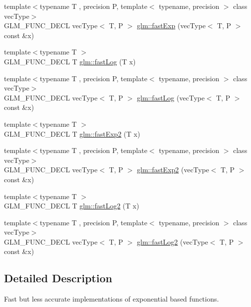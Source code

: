 \begin{DoxyCompactItemize}
{\footnotesize template$<$typename T , precision P, template$<$ typename, precision $>$ class vec\+Type$>$ }\\G\+L\+M\+\_\+\+F\+U\+N\+C\+\_\+\+D\+E\+C\+L vec\+Type$<$ T, P $>$ \hyperlink{group__gtx__fast__exponential_ga4faf0b61115de36efcf47c4ecb55a5fa}{glm\+::fast\+Exp} (vec\+Type$<$ T, P $>$ const \&x)
\item 
{\footnotesize template$<$typename T $>$ }\\G\+L\+M\+\_\+\+F\+U\+N\+C\+\_\+\+D\+E\+C\+L T \hyperlink{group__gtx__fast__exponential_gae1bdc97b7f96a600e29c753f1cd4388a}{glm\+::fast\+Log} (T x)
\item 
{\footnotesize template$<$typename T , precision P, template$<$ typename, precision $>$ class vec\+Type$>$ }\\G\+L\+M\+\_\+\+F\+U\+N\+C\+\_\+\+D\+E\+C\+L vec\+Type$<$ T, P $>$ \hyperlink{group__gtx__fast__exponential_ga789abcbc34d08008d2f5a4547dd6e5e3}{glm\+::fast\+Log} (vec\+Type$<$ T, P $>$ const \&x)
\item 
{\footnotesize template$<$typename T $>$ }\\G\+L\+M\+\_\+\+F\+U\+N\+C\+\_\+\+D\+E\+C\+L T \hyperlink{group__gtx__fast__exponential_ga0af50585955eb14c60bb286297fabab2}{glm\+::fast\+Exp2} (T x)
\item 
{\footnotesize template$<$typename T , precision P, template$<$ typename, precision $>$ class vec\+Type$>$ }\\G\+L\+M\+\_\+\+F\+U\+N\+C\+\_\+\+D\+E\+C\+L vec\+Type$<$ T, P $>$ \hyperlink{group__gtx__fast__exponential_ga9e6219327b7a33077dbec7620d981fff}{glm\+::fast\+Exp2} (vec\+Type$<$ T, P $>$ const \&x)
\item 
{\footnotesize template$<$typename T $>$ }\\G\+L\+M\+\_\+\+F\+U\+N\+C\+\_\+\+D\+E\+C\+L T \hyperlink{group__gtx__fast__exponential_ga6e98118685f6dc9e05fbb13dd5e5234e}{glm\+::fast\+Log2} (T x)
\item 
{\footnotesize template$<$typename T , precision P, template$<$ typename, precision $>$ class vec\+Type$>$ }\\G\+L\+M\+\_\+\+F\+U\+N\+C\+\_\+\+D\+E\+C\+L vec\+Type$<$ T, P $>$ \hyperlink{group__gtx__fast__exponential_gabc46086fe6636b8be87f09e6c5d2bb58}{glm\+::fast\+Log2} (vec\+Type$<$ T, P $>$ const \&x)
\end{DoxyCompactItemize}


\subsection{Detailed Description}
Fast but less accurate implementations of exponential based functions. 

